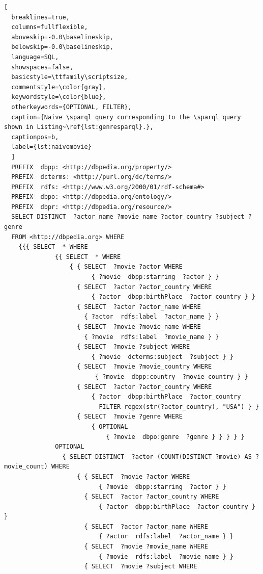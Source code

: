 \begin{lstlisting}[
  breaklines=true,
  columns=fullflexible,
  aboveskip=-0.0\baselineskip,
  belowskip=-0.0\baselineskip,
  language=SQL,
  showspaces=false,
  basicstyle=\ttfamily\scriptsize,
  commentstyle=\color{gray},
  keywordstyle=\color{blue},
  otherkeywords={OPTIONAL, FILTER},
  caption={Naive \sparql query corresponding to the \sparql query shown in Listing~\ref{lst:genresparql}.},
  captionpos=b,
  label={lst:naivemovie}
  ]
  PREFIX  dbpp: <http://dbpedia.org/property/>
  PREFIX  dcterms: <http://purl.org/dc/terms/>
  PREFIX  rdfs: <http://www.w3.org/2000/01/rdf-schema#>
  PREFIX  dbpo: <http://dbpedia.org/ontology/>
  PREFIX  dbpr: <http://dbpedia.org/resource/> 
  SELECT DISTINCT  ?actor_name ?movie_name ?actor_country ?subject ?genre
  FROM <http://dbpedia.org> WHERE
    {{{ SELECT  * WHERE
              {{ SELECT  * WHERE
                  { { SELECT  ?movie ?actor WHERE
                        { ?movie  dbpp:starring  ?actor } }
                    { SELECT  ?actor ?actor_country WHERE
                        { ?actor  dbpp:birthPlace  ?actor_country } }
                    { SELECT  ?actor ?actor_name WHERE
                      { ?actor  rdfs:label  ?actor_name } }
                    { SELECT  ?movie ?movie_name WHERE
                      { ?movie  rdfs:label  ?movie_name } }
                    { SELECT  ?movie ?subject WHERE
                        { ?movie  dcterms:subject  ?subject } }
                    { SELECT  ?movie ?movie_country WHERE
                         { ?movie  dbpp:country  ?movie_country } }
                    { SELECT  ?actor ?actor_country WHERE
                        { ?actor  dbpp:birthPlace  ?actor_country
                          FILTER regex(str(?actor_country), "USA") } }
                    { SELECT  ?movie ?genre WHERE
                        { OPTIONAL
                            { ?movie  dbpo:genre  ?genre } } } } }
              OPTIONAL
                { SELECT DISTINCT  ?actor (COUNT(DISTINCT ?movie) AS ?movie_count) WHERE
                    { { SELECT  ?movie ?actor WHERE
                          { ?movie  dbpp:starring  ?actor } }
                      { SELECT  ?actor ?actor_country WHERE
                          { ?actor  dbpp:birthPlace  ?actor_country } }
                      { SELECT  ?actor ?actor_name WHERE
                          { ?actor  rdfs:label  ?actor_name } }
                      { SELECT  ?movie ?movie_name WHERE
                          { ?movie  rdfs:label  ?movie_name } }
                      { SELECT  ?movie ?subject WHERE

\end{lstlisting}
